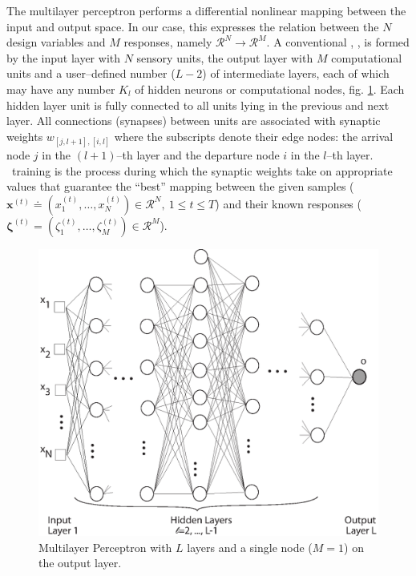 \documentclass{vki_ls}
\newcommand{\vect}[1]{\bm{#1}}
\newcommand{\set}[1]{\mathcal{#1}}
\begin{document}
The multilayer perceptron performs a differential nonlinear mapping between the input and output space. In our case, this expresses the  relation between the $N$ design variables and $M$ responses, namely $\set{R}^N\!\rightarrow\!\set{R}^M$. A conventional \MLP, \cite{Hayk1999}, is formed by the input layer with $N$ sensory units, the output layer with $M$ computational units and a user--defined number ($L\!-\!2$) of intermediate layers, each of which may have any  number $K_l$ of hidden neurons or computational nodes, fig. \ref{f:mlp}.  Each hidden layer unit is fully connected to all units lying in the previous and next layer. All connections (synapses) between units are associated with synaptic weights $w_{[j,l+1],[i,l]}$ where the subscripts denote their edge nodes: the arrival node $j$ in the $(l\!+\!1)$--th layer and the departure node $i$ in the $l$--th layer. \MLP\ training is the process during which the synaptic weights take on appropriate values that guarantee the ``best'' mapping between the given samples ($\vect x^{(t)}\doteq(x^{(t)}_1,\dots,x^{(t)}_N)\!\in\!\set{R}^N,~1\!\le \!t\!\le \!T$) and their known responses ($\vect {\zeta}^{(t)}\!=\!(\zeta^{(t)}_1,\dots,\zeta^{(t)}_M)\!\in\!\set{R}^M$).
%
\begin{figure}
    \centering
    \includegraphics[scale=0.6]{mlp}
    \caption{Multilayer Perceptron with $L$ layers and a single node 
	     ($M\!=\!1$) on the output layer.}
    \label{f:mlp}
\end{figure}
\end{document}

